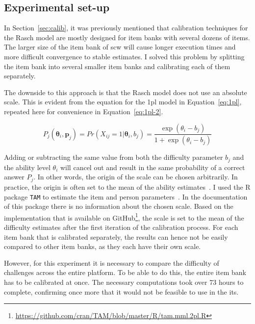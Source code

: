 \subsection{Experimental set-up}
In Section~\ref{sec:calib}, it was previously mentioned that calibration techniques for the Rasch model are mostly designed for item banks with several dozens of items.
The larger size of the item bank of \gls{scw} will cause longer execution times and more difficult convergence to stable estimates.
I solved this problem by splitting the item bank into several smaller item banks and calibrating each of them separately.

The downside to this approach is that the Rasch model does not use an absolute scale.
This is evident from the equation for the \gls{1pl} model in Equation~\ref{eq:1pl}, repeated here for convenience in Equation~\ref{eq:1pl-2}.

\begin{equation}
    \label{eq:1pl-2}
    P_{j}(\bm{\theta}_i,\bm{p}_j) =
    Pr(X_{ij} = 1 | \bm{\theta}_i,b_j) =
    \frac{\exp(\theta_i - b_j)}{1 + \exp(\theta_i - b_j)}
\end{equation}

Adding or subtracting the same value from both the difficulty parameter $b_j$ and the ability level $\theta_i$ will cancel out and result in the same probability of a correct answer $P_j$.
In other words, the origin of the scale can be chosen arbitrarily.
In practice, the origin is often set to the mean of the ability estimates~\cite{magis2017computerized}.
I used the R package \texttt{TAM} to estimate the item and person parameters~\cite{robitzsch2021package}.
In the documentation of this package there is no information about the chosen scale.
Based on the implementation that is available on GitHub\footnote{\url{https://github.com/cran/TAM/blob/master/R/tam.mml.2pl.R}}, the scale is set to the mean of the difficulty estimates after the first iteration of the calibration process.
For each item bank that is calibrated separately, the results can hence not be easily compared to other item banks, as they each have their own scale.

However, for this experiment it is necessary to compare the difficulty of challenges across the entire platform.
To be able to do this, the entire item bank has to be calibrated at once. 
The necessary computations took over 73 hours to complete, confirming once more that it would not be feasible to use in the \gls{its}.


